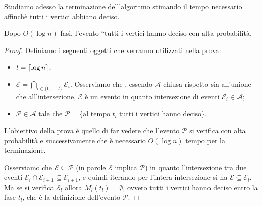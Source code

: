 \documentclass{article}
\begin{document}
Studiamo adesso la terminazione dell'algoritmo stimando il tempo necessario
affinch\`e tutti i vertici abbiano deciso.

\begin{theorem}
    Dopo $O(\log{n})$ fasi, l'evento ``tutti i vertici hanno deciso
     con alta probabilit\`a.
\end{theorem}

\begin{proof}
    Definiamo i seguenti oggetti che verranno utilizzati nella prova:
    \begin{itemize}
        \item $l = \lceil \log{n} \rceil$;
        \item $\mathcal{E} = \bigcap_{i \in 
            \lbrace 0, \ldots, l \rbrace}{\mathcal{E}_i}$. Osserviamo che 
            , essendo $\mathcal{A}$  chiusa 
            rispetto sia all'unione che all'intersezione, $\mathcal{E}$ 
            \`e un evento in quanto intersezione di eventi $\mathcal{E}_i 
            \in \mathcal{A}$;
        \item $\mathcal{P} \in \mathcal{A}$ tale che $\mathcal{P} = 
            \lbrace \text{al tempo $t_l$ tutti i vertici hanno deciso} \rbrace$.
    \end{itemize}

    L'obiettivo della prova \`e quello di far vedere che l'evento 
    $\mathcal{P}$ si verifica con alta probabilit\`a e successivamente
    che \`e necessario $O(\log{n})$ tempo per la terminazione. 

    Osserviamo che $\mathcal{E}\subseteq\mathcal{P}$ (in parole $\mathcal{E}$ 
    implica $\mathcal{P}$) in quanto l'intersezione tra due eventi 
    $\mathcal{E}_i \cap \mathcal{E}_{i+1} \subseteq \mathcal{E}_{i+1}$,
    e quindi iterando per l'intera intersezione si ha $\mathcal{E} 
    \subseteq \mathcal{E}_l$. Ma se si verifica $\mathcal{E}_l$ allora
    $M_l(t_l) = \emptyset$, ovvero tutti i vertici hanno deciso entro la fase
    $t_l$, che \`e la definizione dell'evento $\mathcal{P}$.


\end{proof}
\end{document}
